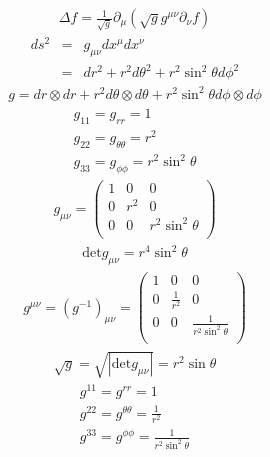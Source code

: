 \documentclass[12pt]{ujarticle}
\begin{document}
\begin{eqnarray}
\Delta f  = \frac{1}{\sqrt{g}}\partial_{\mu}\left(\sqrt{g}g^{\mu\nu}\partial_{\nu}f\right)
\end{eqnarray}
\begin{eqnarray}
ds^2 &=& g_{\mu\nu}dx^{\mu}dx^{\nu} \\
&=& dr^2 + r^2 d\theta^2 + r^2\sin ^2 \theta d\phi^2
\end{eqnarray}
\begin{eqnarray}
g = dr \otimes dr + r^2 d\theta \otimes d\theta + r^2\sin^2\theta d\phi \otimes d\phi
\end{eqnarray}
\begin{eqnarray}
g_{11} = g_{rr} = 1 \\
g_{22} = g_{\theta\theta} = r^2 \\
g_{33} = g_{\phi\phi} = r^2\sin^2\theta
\end{eqnarray}
\begin{eqnarray}
g_{\mu\nu} =
\begin{pmatrix}
1 & 0  & 0\\
0 & r^2 & 0 \\
0 & 0 & r^2\sin^2\theta \\
\end{pmatrix}
\end{eqnarray}
\begin{eqnarray}
\mathrm{det}g_{\mu\nu} = r^4\sin^2\theta
\end{eqnarray}
\begin{eqnarray}
g^{\mu\nu} = \left(g^{-1}\right)_{\mu\nu} =
\begin{pmatrix}
1 & 0 & 0 \\
0 & \frac{1}{r^2} & 0 \\
0 & 0 & \frac{1}{r^2\sin^2\theta} \\
\end{pmatrix}
\end{eqnarray}
\begin{eqnarray}
\sqrt{g} = \sqrt{\left|\mathrm{det}g_{\mu\nu}\right|} = r^2\sin\theta
\end{eqnarray}
\begin{align}
g^{11} = g^{rr} = 1 \\
g^{22} = g^{\theta\theta} = \frac{1}{r^2} \\
g^{33} = g^{\phi\phi} = \frac{1}{r^2\sin^2\theta}
\end{align}
\end{document}
